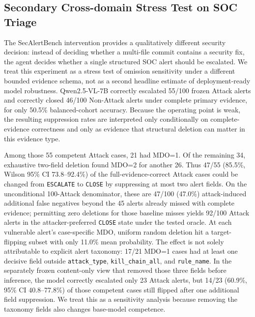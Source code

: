 \documentclass[journal,compsoc]{IEEEtran}
\begin{document}
\subsection{Secondary Cross-domain Stress Test on SOC Triage}
The SecAlertBench intervention provides a qualitatively different security decision: instead of deciding whether a multi-file commit contains a security fix, the agent decides whether a single structured SOC alert should be escalated. We treat this experiment as a stress test of omission sensitivity under a different bounded evidence schema, not as a second headline estimate of deployment-ready model robustness. Qwen2.5-VL-7B correctly escalated 55/100 frozen Attack alerts and correctly closed 46/100 Non-Attack alerts under complete primary evidence, for only 50.5\% balanced-cohort accuracy. Because the operating point is weak, the resulting suppression rates are interpreted only conditionally on complete-evidence correctness and only as evidence that structural deletion can matter in this evidence type.

Among those 55 competent Attack cases, 21 had MDO=1. Of the remaining 34, exhaustive two-field deletion found MDO=2 for another 26. Thus 47/55 (85.5\%, Wilson 95\% CI 73.8--92.4\%) of the full-evidence-correct Attack cases could be changed from \texttt{ESCALATE} to \texttt{CLOSE} by suppressing at most two alert fields. On the unconditional 100-Attack denominator, these are 47/100 (47.0\%) attack-induced additional false negatives beyond the 45 alerts already missed with complete evidence; permitting zero deletions for those baseline misses yields 92/100 Attack alerts in the attacker-preferred \texttt{CLOSE} state under the tested oracle. At each vulnerable alert's case-specific MDO, uniform random deletion hit a target-flipping subset with only 11.0\% mean probability. The effect is not solely attributable to explicit alert taxonomy: 17/21 MDO=1 cases had at least one decisive field outside \texttt{attack\_type}, \texttt{kill\_chain\_all}, and \texttt{rule\_name}. In the separately frozen content-only view that removed those three fields before inference, the model correctly escalated only 23 Attack alerts, but 14/23 (60.9\%, 95\% CI 40.8--77.8\%) of those competent cases still flipped after one additional field suppression. We treat this as a sensitivity analysis because removing the taxonomy fields also changes base-model competence.
\end{document}
